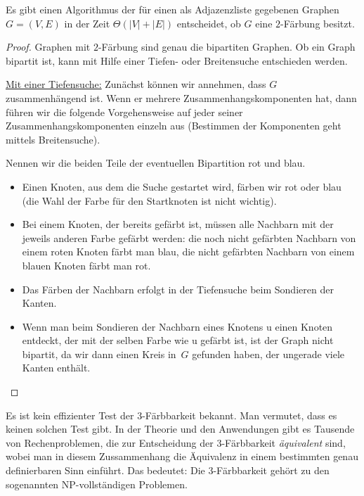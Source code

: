 \begin{prop}
		Es gibt einen Algorithmus der für einen als Adjazenzliste gegebenen Graphen $G=(V,E)$ in der Zeit $\Theta(|V|+|E|)$ entscheidet, ob $G$ eine $2$-Färbung besitzt. 
\end{prop} 
\begin{proof}
	Graphen mit $2$-Färbung sind genau die bipartiten Graphen. Ob ein Graph bipartit ist, kann mit Hilfe einer Tiefen- oder Breitensuche entschieden werden.
	
	\underline{Mit einer Tiefensuche:} Zunächst können wir annehmen, dass $G$ zusammenhängend ist. Wenn er mehrere Zusammenhangskomponenten hat, dann führen wir die folgende Vorgehensweise auf jeder seiner Zusammenhangskomponenten einzeln aus (Bestimmen der Komponenten geht mittels Breitensuche).
	
	Nennen wir die beiden Teile der eventuellen Bipartition rot und blau.
	\begin{itemize}
	 \item 	Einen Knoten, aus dem die Suche gestartet wird, färben wir rot oder blau (die Wahl der Farbe für den Startknoten ist nicht wichtig).
	 \item Bei einem Knoten, der bereits gefärbt ist, müssen alle Nachbarn mit der jeweils anderen Farbe gefärbt werden: die noch nicht gefärbten Nachbarn von einem roten Knoten färbt man blau, die nicht gefärbten Nachbarn von einem blauen Knoten färbt man rot.
	 \item Das Färben der Nachbarn erfolgt in der Tiefensuche beim Sondieren der Kanten.
	 \item Wenn man beim Sondieren der Nachbarn eines Knotens u einen Knoten entdeckt, der mit der selben Farbe wie u gefärbt ist, ist der Graph nicht bipartit, da wir dann einen Kreis in~$G$ gefunden haben, der ungerade viele Kanten enthält.
	\end{itemize}
\end{proof} 

\begin{bem}
	Es ist kein effizienter Test der $3$-Färbbarkeit bekannt. Man vermutet, dass es keinen solchen Test gibt. 
	In der Theorie und den Anwendungen gibt es Tausende von Rechenproblemen, die zur Entscheidung der $3$-Färbbarkeit \emph{äquivalent} sind, wobei man in diesem Zussammenhang die Äquivalenz in einem bestimmten genau definierbaren Sinn einführt. Das bedeutet: Die $3$-Färbbarkeit gehört zu den sogenannten $\mathrm{NP}$-vollständigen Problemen. 
\end{bem} 


